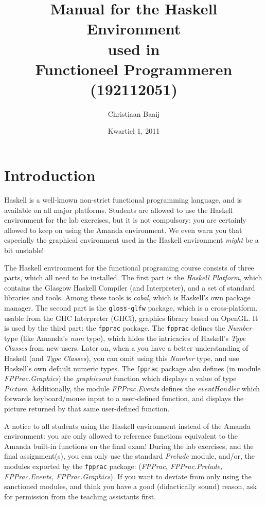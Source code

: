 \documentclass[]{article}
\title{Manual for the Haskell Environment \\ used in \\ Functioneel Programmeren (192112051)}
\author{Christiaan Baaij}
\date{Kwartiel 1, 2011}
\begin{document}

\maketitle

\section{Introduction}
Haskell is a well-known non-strict functional programming language, and is available on all major platforms.
Students are allowed to use the Haskell environment for the lab exercises, but it is not compulsory: you are certainly allowed to keep on using the Amanda environment.
We even warn you that especially the graphical environment used in the Haskell environment \emph{might} be a bit unstable!

The Haskell environment for the functional programing course consists of three parts, which all need to be installed.
The first part is the \emph{Haskell Platform}, which contains the Glasgow Haskell Compiler (and Interpreter), and a set of standard libraries and tools. 
Among these tools is \emph{cabal}, which is Haskell's own package manager. The second part is the \texttt{gloss-glfw} package, which is a cross-platform, usable from the GHC Interpreter (GHCi), graphics library based on OpenGL.
It is used by the third part: the \texttt{fpprac} package. The \texttt{fpprac} defines the \emph{Number} type (like Amanda's \emph{num} type), which hides the intricacies of Haskell's \emph{Type Classes} from new users.
Later on, when a you have a better understanding of Haskell (and \emph{Type Classes}), you can omit using this \emph{Number} type, and use Haskell's own default numeric types.
The \texttt{fpprac} package also defines (in module \emph{FPPrac.Graphics}) the \emph{graphicsout} function which displays a value of type \emph{Picture}. Additionally, the module \emph{FPPrac.Events} defines the \emph{eventHandler} which forwards keyboard/mouse input to a user-defined function, and displays the picture returned by that same user-defined function.

A notice to all students using the Haskell environment instead of the Amanda environment: you are only allowed to reference functions equivalent to the Amanda built-in functions on the final exam! 
During the lab exercises, and the final assignment(s), you can only use the standard \emph{Prelude} module, and/or, the modules exported by the \texttt{fpprac} package: (\emph{FPPrac, FPPrac.Prelude, FPPrac.Events, FPPrac.Graphics}).
If you want to deviate from only using the sanctioned modules, and think you have a good (didactically sound) reason, ask for permission from the teaching assistants first.
\end{document}

